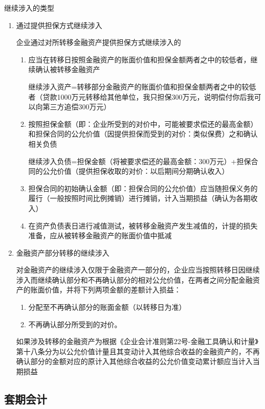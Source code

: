 \documentclass[UTF8,12pt]{ctexart}
\numberwithin{equation}{section} %
\numberwithin{figure}{section}
\numberwithin{table}{section}
\begin{document}
	继续涉入的类型
	\begin{enumerate}
		\item 通过提供担保方式继续涉入
		
		企业通过对所转移金融资产提供担保方式继续涉入的
		\begin{enumerate}
			\item 应当在转移日按照金融资产的账面价值和担保金额两者之中的较低者，继续确认被转移金融资产
			
			继续涉入资产=转移部分金融资产的账面价值和担保金额两者之中的较低者（贷款1000万元转移给其他单位，我只担保300万元，说明偿付你后我可以向第三方追偿300万元）
			
			\item 按照担保金额（即：企业所受到的对价中，可能被要求偿还的最高金额）和担保合同的公允价值（因提供担保而受到的对价：类似保费）之和确认相关负债
			
			继续涉入负债=担保金额（将被要求偿还的最高金额：300万元）+担保合同的公允价值（提供担保收取的对价：以后期间分期确认收入）
			
			\item 担保合同的初始确认金额（即：担保合同的公允价值）应当随担保义务的履行（一般按照时间比例摊销）进行摊销，计入当期损益（确认为各期收入）
			
			\item 在资产负债表日进行减值测试，被转移金融资产发生减值的，计提的损失准备，应从被转移金融资产的账面价值中抵减
		\end{enumerate}
		
		\item 金融资产部分转移的继续涉入
		
		对金融资产的继续涉入仅限于金融资产一部分的，企业应当按照转移日因继续涉入而继续确认部分和不再确认部分的相对公允价值，在两者之间分配金融资产的账面价值，并将下列两项金额的差额计入损益：
		\begin{enumerate}
			\item 分配至不再确认部分的账面金额（以转移日为准）
			
			\item 不再确认部分所受到的对价。
		\end{enumerate}
	
		如果涉及转移的金融资产为根据《企业会计准则第22号-金融工具确认和计量》第十八条分为以公允价值计量且其变动计入其他综合收益的金融资产的，不再确认部分的金额对应的原计入其他综合收益的公允价值变动累计额应当计入当期损益
	\end{enumerate}
	
	\subsection{套期会计}
\end{document}
